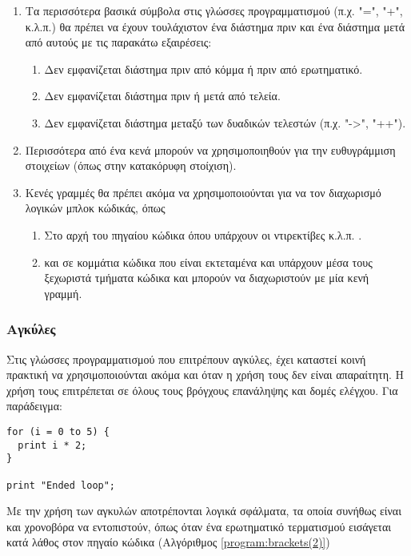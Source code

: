 \begin{enumerate}
\item Τα περισσότερα βασικά σύμβολα στις γλώσσες προγραμματισμού (π.χ. "=", "+", κ.λ.π.) θα πρέπει να έχουν τουλάχιστον ένα διάστημα πριν και ένα διάστημα μετά από αυτούς με τις παρακάτω εξαιρέσεις:
  \begin{enumerate}
  \item Δεν εμφανίζεται διάστημα πριν από κόμμα ή πριν από ερωτηματικό.
  \item Δεν εμφανίζεται διάστημα πριν ή μετά από τελεία.
  \item Δεν εμφανίζεται διάστημα μεταξύ των δυαδικών τελεστών (π.χ. "->", "++").
  \end{enumerate}
\item Περισσότερα από ένα κενά μπορούν να χρησιμοποιηθούν για την ευθυγράμμιση στοιχείων (όπως στην κατακόρυφη στοίχιση).
\item Κενές γραμμές θα πρέπει ακόμα να χρησιμοποιούνται για να τον διαχωρισμό λογικών μπλοκ κώδικάς, όπως
  \begin{enumerate}
  \item Στο αρχή του πηγαίου κώδικα όπου υπάρχουν οι ντιρεκτίβες  κ.λ.π. .
  \item και σε κομμάτια κώδικα που είναι εκτεταμένα και υπάρχουν μέσα τους ξεχωριστά τμήματα κώδικα και μπορούν να διαχωριστούν με μία κενή γραμμή.
  \end{enumerate}
\end{enumerate}


\subsubsection{Αγκύλες}

Στις γλώσσες προγραμματισμού που επιτρέπουν αγκύλες, έχει καταστεί κοινή πρακτική να χρησιμοποιούνται ακόμα και όταν η χρήση τους δεν είναι απαραίτητη. Η χρήση τους επιτρέπεται σε όλους τους βρόγχους επανάληψης και δομές ελέγχου. Για παράδειγμα:

\begin{lstlisting}[style=cpp, caption= Αγκύλες (1), label=program:brackets(1)]
for (i = 0 to 5) {
  print i * 2;
}
 
print "Ended loop";
\end{lstlisting}

Με την χρήση των αγκυλών αποτρέπονται λογικά σφάλματα, τα οποία συνήθως είναι και χρονοβόρα να εντοπιστούν, όπως όταν ένα ερωτηματικό τερματισμού εισάγεται κατά λάθος στον πηγαίο κώδικα (Αλγόριθμος \ref{program:brackets(2)})

